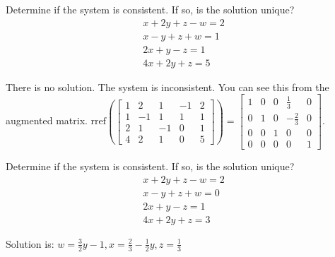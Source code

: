 \documentclass{ximera}
\begin{document}
\begin{problem}\label{prb:2.15}
Determine if the system is consistent. If so, is the solution unique?
\begin{equation*}
\begin{array}{c}
x+2y+z-w=2 \\
x-y+z+w=1 \\
2x+y-z=1 \\
4x+2y+z=5
\end{array}
\end{equation*}
\begin{hint}
There is no solution. The system is inconsistent. You can see this from the
augmented matrix. $\mbox{rref}\left(\left[
\begin{array}{rrrr|r}
1 & 2 & 1 & -1 & 2 \\
1 & -1 & 1 & 1 & 1 \\
2 & 1 & -1 & 0 & 1 \\
4 & 2 & 1 & 0 & 5
\end{array}
\right]\right) = \left[
\begin{array}{rrrr|r}
1 & 0 & 0 &  \frac{1}{3} & 0 \\
0 & 1 & 0 & - \frac{2}{3} & 0 \\
0 & 0 & 1 & 0 & 0 \\
0 & 0 & 0 & 0 & 1
\end{array}
\right] .$
\end{hint}
\end{problem}

\begin{problem}\label{prb:2.16}
Determine if the system is consistent. If so, is the solution unique?
\begin{equation*}
\begin{array}{c}
x+2y+z-w=2 \\
x-y+z+w=0 \\
2x+y-z=1 \\
4x+2y+z=3
\end{array}
\end{equation*}
\begin{hint}
Solution is: $ w=\frac{3}{2}y-1, x=\frac{2}{3}-\frac{1}{2}y, z=\frac{1}{3} $
\end{hint}
\end{problem}
\end{document}
